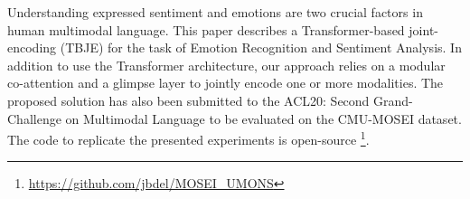 Understanding expressed sentiment and emotions are two crucial factors in human multimodal language. This paper describes a Transformer-based joint-encoding (TBJE) for the task of Emotion Recognition and Sentiment Analysis. In addition to use the Transformer architecture, our approach relies on a modular co-attention and a glimpse layer to jointly encode one or more modalities. The proposed solution has also been submitted to the ACL20: Second Grand-Challenge on Multimodal Language to be evaluated on the CMU-MOSEI dataset. The code to replicate the presented experiments is open-source \footnote{\url{https://github.com/jbdel/MOSEI\_UMONS}}.
